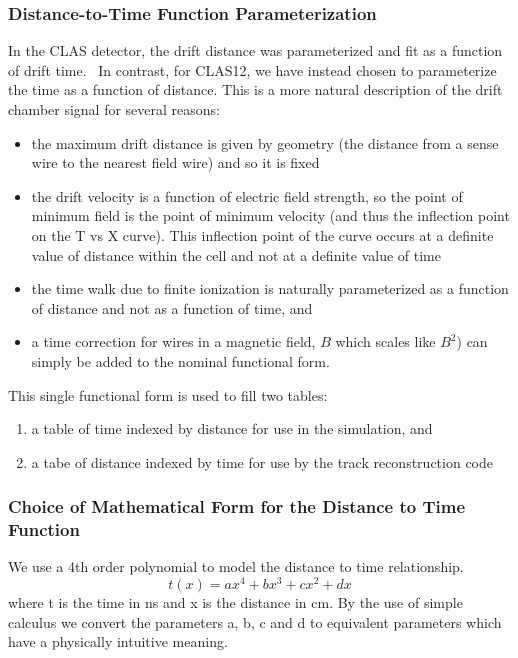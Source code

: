 \subsubsection{Distance-to-Time Function Parameterization}
\label{funcpar} 

In the CLAS detector, the drift distance was parameterized and fit as a function
of drift time.~\cite{mdm95}
In contrast, for CLAS12, we have instead chosen to parameterize the time as a function of
distance.  This is a more natural description of the drift chamber signal
for several reasons:
\begin{itemize}
\item the maximum drift distance is given by geometry (the distance from
a sense wire to the nearest field wire) and so it is fixed
\item the drift velocity is a function of electric field strength, so the
point of minimum field is the point of minimum velocity (and thus the inflection point on the T vs X curve). 
This inflection point of the curve occurs at a
definite value of distance within the cell and not at a definite value of time
\item the time walk due to finite ionization is
naturally parameterized as a function of distance and not as a function of time, and
\item  a time correction for wires in a magnetic field, $B$ which
scales like $B^2$) can simply be added to the nominal functional form.
\end{itemize}

This single functional form is used to fill two tables: 
\begin{enumerate}
\item a table of time indexed by distance for use in the simulation, and 
\item a tabe of distance indexed by time for use by the track reconstruction code
\end{enumerate}


\subsubsection{Choice of Mathematical Form for the Distance to Time Function}
We use a 4th order polynomial to model the distance to time relationship.
\begin{equation}
t(x) =  a x^4 + b x^3 + c x^2 + d x
\end{equation}
where t is the time in ns and x is the distance in cm.
By the use of simple calculus we convert the parameters a, b, c and d to equivalent parameters which have
a physically intuitive meaning.

